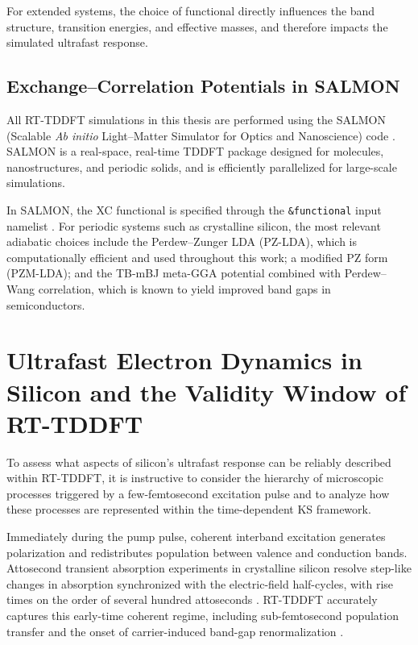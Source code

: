 For extended systems, the choice of functional directly influences the band structure, transition energies, and effective masses, and therefore impacts the simulated ultrafast response.

\subsection{Exchange--Correlation Potentials in SALMON}

All RT-TDDFT simulations in this thesis are performed using the SALMON (Scalable \textit{Ab initio} Light--Matter Simulator for Optics and Nanoscience) code \cite{Noda_2019}. SALMON is a real-space, real-time TDDFT package designed for molecules, nanostructures, and periodic solids, and is efficiently parallelized for large-scale simulations.

In SALMON, the XC functional is specified through the \texttt{\&functional} input namelist \cite{SALMONmanual}. For periodic systems such as crystalline silicon, the most relevant adiabatic choices include the Perdew--Zunger LDA (PZ-LDA), which is computationally efficient and used throughout this work; a modified PZ form (PZM-LDA); and the TB-mBJ meta-GGA potential combined with Perdew--Wang correlation, which is known to yield improved band gaps in semiconductors.


\section{Ultrafast Electron Dynamics in Silicon and the Validity Window of RT-TDDFT}

To assess what aspects of silicon’s ultrafast response can be reliably described within RT-TDDFT, it is instructive to consider the hierarchy of microscopic processes triggered by a few-femtosecond excitation pulse and to analyze how these processes are represented within the time-dependent KS framework.

Immediately during the pump pulse, coherent interband excitation generates polarization and redistributes population between valence and conduction bands. Attosecond transient absorption experiments in crystalline silicon resolve step-like changes in absorption synchronized with the electric-field half-cycles, with rise times on the order of several hundred attoseconds \cite{Schultze2014Si}. RT-TDDFT accurately captures this early-time coherent regime, including sub-femtosecond population transfer and the onset of carrier-induced band-gap renormalization \cite{Schultze2014Si,Yabana2012,Sato2025review}.

